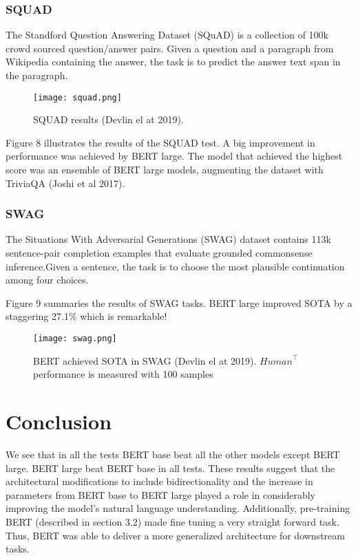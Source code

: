 \documentclass[12pt,a4paper]{article}
\numberwithin{equation}{section}
\begin{document}
\subsubsection{SQUAD}
The Standford Question Answering Dataset (SQuAD) is a collection of 100k crowd sourced question/answer pairs. Given a question and a paragraph from Wikipedia containing the answer, the task is to predict the answer text span in the paragraph.
\begin{figure}
    \centering
    \texttt{[image: squad.png]}
    \caption{SQUAD results (Devlin el at 2019).   }
   \label{fig:my_label}
\end{figure}
Figure 8 illustrates the results of the SQUAD test. A big improvement in performance was achieved by BERT large. The model that achieved the highest score was an ensemble of BERT large models, augmenting the dataset with TriviaQA (Joshi et al 2017).
\subsubsection{SWAG}
The Situations With Adversarial Generations (SWAG) dataset contains 113k sentence-pair completion examples that evaluate grounded commonsense inference.Given a sentence, the task is to choose the most plausible continuation among four choices.

Figure 9 summaries the results of SWAG tasks. BERT large improved SOTA by a staggering 27.1\% which is remarkable!
\begin{figure}
    \centering
    \texttt{[image: swag.png]}
    \caption{BERT achieved SOTA in SWAG (Devlin el at 2019). $ {Human}^\top$ performance is measured with 100 samples}
   \label{fig:my_label}
\end{figure}

\section{Conclusion}
We see that in all the tests BERT base beat all the other models except BERT large. BERT large beat BERT base in all tests. These results suggest that the architectural modifications to include  bidirectionality and the increase in parameters from BERT base to BERT large played a role in considerably improving the model's natural language understanding. Additionally, pre-training BERT (described in section 3.2) made fine tuning a very straight forward task. Thus, BERT was able to deliver a more generalized architecture for downstream tasks. 
\end{document}
